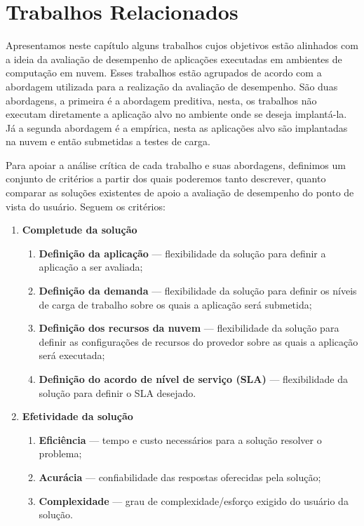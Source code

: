 \chapter[Trabalhos Relacionados]{Trabalhos Relacionados}
Apresentamos  neste capítulo alguns trabalhos cujos objetivos estão alinhados 
com a ideia da avaliação de desempenho de aplicações executadas em ambientes de
computação em nuvem. Esses trabalhos estão agrupados de acordo com a abordagem utilizada para a realização da avaliação de desempenho. São duas abordagens, a primeira é a abordagem preditiva, nesta, os trabalhos não executam diretamente a aplicação alvo no ambiente onde se deseja implantá-la. Já a segunda abordagem é a empírica, nesta as aplicações alvo são implantadas na nuvem e então submetidas a testes de carga. 

Para apoiar a análise crítica de cada trabalho e suas abordagens, definimos um conjunto de critérios a partir dos quais poderemos tanto descrever, quanto comparar as soluções existentes de apoio a avaliação de desempenho do ponto de vista do usuário. Seguem os critérios:

\begin{enumerate}
  \item \textbf{Completude da solução}
  \begin{enumerate}
    \item \textbf{Definição da aplicação} --- flexibilidade da solução para
    definir a aplicação a ser avaliada;
    \item \textbf{Definição da demanda} --- flexibilidade da solução para
    definir os níveis de carga de trabalho sobre os quais a aplicação será
    submetida;
	\item \textbf{Definição dos recursos da nuvem} --- flexibilidade da solução
	para definir as configurações de recursos do provedor sobre as quais a aplicação
	será executada;
	\item \textbf{Definição do acordo de nível de serviço (SLA)} --- flexibilidade
	da solução para definir o SLA desejado.
  \end{enumerate}
  \item \textbf{Efetividade da solução}  
  \begin{enumerate}
    \item \textbf{Eficiência} --- tempo e custo necessários para a solução
    resolver o problema;
    \item \textbf{Acurácia} --- confiabilidade das respostas oferecidas pela
    solução;
	\item \textbf{Complexidade} --- grau de complexidade/esforço exigido do usuário
	da solução.
  \end{enumerate}
\end{enumerate}

